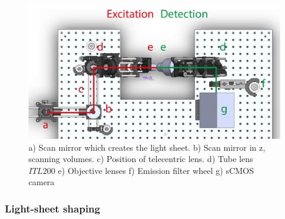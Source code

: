 
%

\begin{figure}
	\centering
	\includegraphics[width=\linewidth]{Figures/soldiworks_top}
	\caption[Top down schematic of SPIM]{a) Scan mirror which creates the light sheet.
b) Scan mirror in z, scanning volumes. c) Position of telecentric lens. d) Tube lens $ITL200$ e) Objective lenses f) Emission filter wheel g) sCMOS camera}
	\label{fig:soldiworks_top}
\end{figure}


\subsubsection{Light-sheet shaping} %


